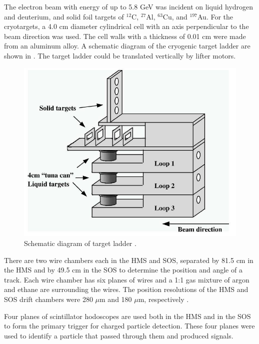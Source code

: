 %
\label{Target}
The electron beam with energy of up to 5.8 GeV was incident on liquid hydrogen and deuterium, and solid foil targets of $^{12}$C, $^{27}$Al, $^{63}$Cu, and $^{197}$Au. For the cryotargets, a 4.0 cm diameter cylindrical cell with an axis perpendicular to the beam direction was used. The cell walls with a thickness of 0.01 cm were made from an aluminum alloy. A schematic diagram of the cryogenic target ladder are shown in . The target ladder could be translated vertically by lifter motors.

\begin{figure}[tbp]
  \centering
  \includegraphics[width=0.8\columnwidth]{target}
  \caption[Schematic diagram of target ladder \cite{BC06}.]{\label{fig:target}Schematic diagram of target ladder \cite{BC06}.}
\end{figure}

%
\label{Detector Packages}
There are two wire chambers each in the HMS and SOS, separated by 81.5 cm in the HMS and by 49.5 cm in the SOS to determine the position and angle of a track. Each wire chamber has six planes of wires and a 1:1 gas mixture of argon and ethane are surrounding the wires. The position resolutions of the HMS and SOS drift chambers were 280 $\mu$m and 180 $\mu$m, respectively \cite{BC06, hinton01}.

Four planes of scintillator hodoscopes are used both in the HMS and in the SOS to form the primary trigger for charged particle detection. These four planes were used to identify a particle that passed through them and produced signals.


